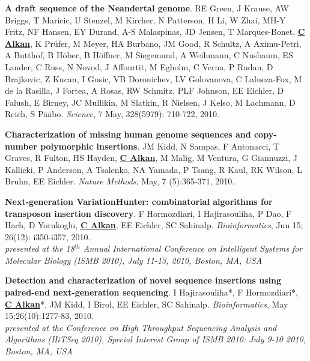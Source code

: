 \vspace{-.2cm}
 {\bf A draft sequence of the Neandertal genome}. RE Green, J Krause, 
AW Briggs, T Maricic, U Stenzel, M Kircher, N Patterson, 
H Li, W Zhai, MH-Y Fritz, NF Hansen, EY Durand, 
A-S Malaspinas, JD Jensen, T Marques-Bonet, {\bf {\underline {C Alkan}}}, K Pr\"{u}fer, M Meyer, HA Burbano, JM Good, R Schultz, A Aximu-Petri, 
A Butthof, B H\"{o}ber, B H\"{o}ffner, M Siegemund, A Weihmann, C
Nusbaum, ES Lander, C Russ, N Novod, J Affourtit, M Egholm, 
C Verna, P Rudan, D Brajkovic, Z Kucan, I Gusic, VB 
Doronichev, LV Golovanova, C Lalueza-Fox, M de la Rasilla, J Fortea, 
A Rosas, RW Schmitz, PLF Johnson, EE Eichler, D Falush, E 
Birney, JC Mullikin, M Slatkin, R Nielsen, J Kelso, M Lachmann, 
D Reich, S P\"{a}\"{a}bo. {\em Science}, 7 May, 328(5979): 710-722, 2010. \\


\vspace{-.2cm}
{\bf Characterization of missing human genome sequences and
copy-number polymorphic insertions}.
JM Kidd, N Sampas, F Antonacci, T Graves, R Fulton, HS Hayden, {\bf {\underline{C Alkan}}},
 M Malig, M Ventura, G Giannuzzi, J Kallicki, P Anderson, A Tsalenko, 
NA Yamada, P Tsang, R Kaul, RK Wilson, L Bruhn, EE Eichler.
{\em Nature Methods}, May, 7 (5):365-371, 2010.


\vspace{-.2cm}
{\bf Next-generation VariationHunter: combinatorial algorithms for transposon insertion discovery}.
F Hormozdiari, I Hajirasouliha, P Dao, F Hach, D Yorukoglu, {\bf {\underline{C Alkan}}},
 EE Eichler, SC Sahinalp.
{\em Bioinformatics}, Jun 15; 26(12): i350-i357, 2010. \\
\hspace*{1cm} {\footnotesize {\em presented at the 18$^{th}$ Annual International Conference on Intelligent Systems
for Molecular Biology (ISMB 2010), July 11-13, 2010, Boston, MA, USA}}


\vspace{-.2cm}
{\bf Detection and characterization of novel sequence insertions using paired-end next-generation sequencing}.
 I Hajirasouliha*, F Hormozdiari*, {\bf {\underline{C Alkan}}}*, JM Kidd, I Birol, EE Eichler,
 SC Sahinalp.
{\em Bioinformatics}, May 15;26(10):1277-83, 2010. \\
\hspace*{1cm} {\footnotesize {\em presented at the Conference on High Throughput Sequencing Analysis and Algorithms (HiTSeq 2010), 
    Special Interest Group of ISMB 2010: July 9-10 2010, Boston, MA, USA}}



